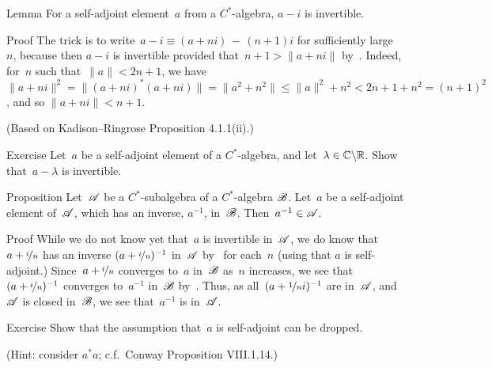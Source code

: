 \documentclass[main]{subfiles}
\begin{document}
%
%
\begin{parsec}%
\begin{point}{Lemma}%
For a self-adjoint element~$a$ from a $C^*$-algebra,
$a-i$ is invertible.
\end{point}
\begin{point}{Proof}%
The trick
is to 
write~$a-i\equiv (a+ni)\,-\,(n+1)i$
for sufficiently large~$n$,
because  
then
$a-i$
is invertible provided that~$n+1 > \|a+ni\|$
by~.
Indeed, for~$n$ such that~$\|a\|<2n+1$,
we have $\|a+ni\|^2 = \|(a+ni)^*(a+ni)\|
= \|a^2+n^2\|
\leq \|a\|^2+n^2 < 2n+1+n^2 = (n+1)^2$,
and so $\|a+ni\| < n+1$.

(Based on Kadison--Ringrose Proposition 4.1.1(ii).)
\end{point}
\begin{point}{Exercise}%
Let~$a$ be a self-adjoint element of a $C^*$-algebra,
and let~$\lambda\in\mathbb{C}\backslash\mathbb{R}$.
Show that~$a-\lambda$ is invertible.
\end{point}
\end{parsec}

\begin{parsec}%
\begin{point}{Proposition}%
Let~$\mathscr{A}$ be a $C^*$-subalgebra
of a $C^*$-algebra $\mathscr{B}$.
Let~$a$ be a self-adjoint element of~$\mathscr{A}$,
which has an inverse, $a^{-1}$, in~$\mathscr{B}$.
Then~$a^{-1}\in\mathscr{A}$.
\end{point}
\begin{point}{Proof}%
While we do not know yet that~$a$ is invertible in~$\mathscr{A}$,
we do know that~$a+\nicefrac{i}{n}$ 
has an inverse $(a+\nicefrac{i}{n})^{-1}$ in~$\mathscr{A}$
by~
for each~$n$
(using that $a$ is self-adjoint.)
Since~$a+\nicefrac{i}{n}$ converges to~$a$ in~$\mathscr{B}$ as~$n$ increases,
we see that $(a+\nicefrac{i}{n})^{-1}$ converges to~$a^{-1}$
in~$\mathscr{B}$ by~.
Thus, as all~$(a+\nicefrac{1}{n}i)^{-1}$ are in~$\mathscr{A}$,
and~$\mathscr{A}$ is closed in~$\mathscr{B}$,
we see that~$a^{-1}$ is in~$\mathscr{A}$.
\end{point}
\begin{point}{Exercise}%
Show that the assumption that~$a$ is self-adjoint
can be dropped. 

(Hint: consider $a^*a$; c.f.~Conway Proposition VIII.1.14.)
\end{point}
\end{parsec}
\end{document}
